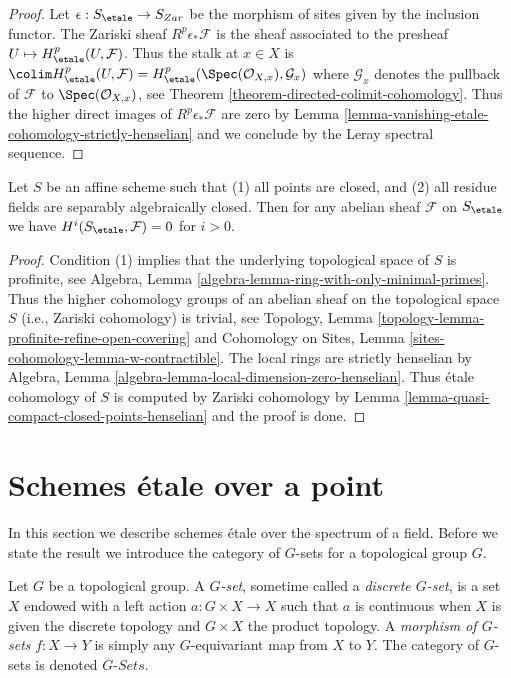 \begin{proof}
Let $\epsilon : S_\etale \to S_{Zar}$ be the morphism of sites given
by the inclusion functor. The Zariski sheaf $R^p\epsilon_*\mathcal{F}$
is the sheaf associated to the presheaf $U \mapsto H^p_\etale(U, \mathcal{F})$.
Thus the stalk at $x \in X$ is
$\colim H^p_\etale(U, \mathcal{F}) =
H^p_\etale(\Spec(\mathcal{O}_{X, x}), \mathcal{G}_x)$
where $\mathcal{G}_x$ denotes the pullback of $\mathcal{F}$
to $\Spec(\mathcal{O}_{X, x})$, see
Theorem \ref{theorem-directed-colimit-cohomology}.
Thus the higher direct images of $R^p\epsilon_*\mathcal{F}$ are
zero by
Lemma \ref{lemma-vanishing-etale-cohomology-strictly-henselian}
and we conclude by the Leray spectral sequence.
\end{proof}

\begin{lemma}
\label{lemma-affine-only-closed-points}
Let $S$ be an affine scheme such that
(1) all points are closed, and (2) all residue fields are separably
algebraically closed. Then
for any abelian sheaf $\mathcal{F}$ on $S_\etale$ we have
$H^i(S_\etale, \mathcal{F}) = 0$ for $i > 0$.
\end{lemma}

\begin{proof}
Condition (1) implies that the underlying topological space
of $S$ is profinite, see
Algebra, Lemma \ref{algebra-lemma-ring-with-only-minimal-primes}.
Thus the higher cohomology groups of an abelian sheaf on the topological
space $S$ (i.e., Zariski cohomology) is trivial, see
Topology, Lemma \ref{topology-lemma-profinite-refine-open-covering}
and
Cohomology on Sites, Lemma \ref{sites-cohomology-lemma-w-contractible}.
The local rings are strictly henselian by
Algebra, Lemma \ref{algebra-lemma-local-dimension-zero-henselian}.
Thus \'etale cohomology of $S$ is computed by Zariski cohomology
by Lemma \ref{lemma-quasi-compact-closed-points-henselian}
and the proof is done.
\end{proof}


\section{Schemes \'etale over a point}
\label{section-schemes-etale-point}

\noindent
In this section we describe schemes \'etale over the spectrum of
a field. Before we state the result we introduce
the category of $G$-sets for a topological group $G$.

\begin{definition}
\label{definition-G-set-continuous}
Let $G$ be a topological group.
A {\it $G$-set}, sometime called a {\it discrete $G$-set},
is a set $X$ endowed with a left action $a : G \times X \to X$
such that $a$ is continuous when $X$ is given the discrete topology and
$G \times X$ the product topology.
A {\it morphism of $G$-sets} $f : X \to Y$ is simply any $G$-equivariant
map from $X$ to $Y$.
The category of $G$-sets is denoted {\it $G\textit{-Sets}$}.
\end{definition}

